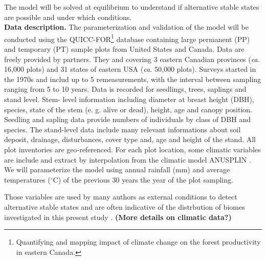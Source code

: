
The model will be solved at equilibrium to understand if alternative
stable states are possible and under which conditions.\\


\textbf{Data description.} The parameterization and validation of the model
will be conducted using the QUICC-FOR\footnote{Quantifying and mapping impact
of climate change on the forest productivity in eastern Canada.} database
containing large permanent (PP) and temporary (PT) sample plots from
United States and Canada. Data are freely provided by partners. They and
covering 3 eastern Canadian provinces (\textit{ca.} 16,000 plots) and 31 states of
eastern USA (\textit{ca.} 50,000 plots). Surveys started in the 1970s and includ up to
5 remeasurements, with the interval between sampling ranging from 5 to 10
years. Data is recorded for seedlings, trees, saplings and stand level. Stem-
level information including diameter at breast height (DBH), species, state of
the stem (e. g. alive or dead), height, age and canopy position. Seedling and
sapling data provide numbers of individuals by class of DBH and species. The
stand-level data include many relevant informations about soil deposit,
drainage, disturbances, cover type and, age and height of the stand. All plot
inventories are geo-referenced. For each plot location, some climatic
variables are include and extract by interpolation from the climatic model
ANUSPLIN \cite{McKenney2011}. We will parameterize the model using annual
rainfall (mm) and average temperatures (\ensuremath{^\circ}C) of the previous
30 years the year of the plot sampling. 


Those variables are used by many
authors as external conditions to detect alternative stable states and are
often indicative of the distrbution of biomes investigated in this present
study \cite{Goldblum2010,Hirota2011,Scheffer2012}. \textbf{(More details on
climatic data?)}\\


